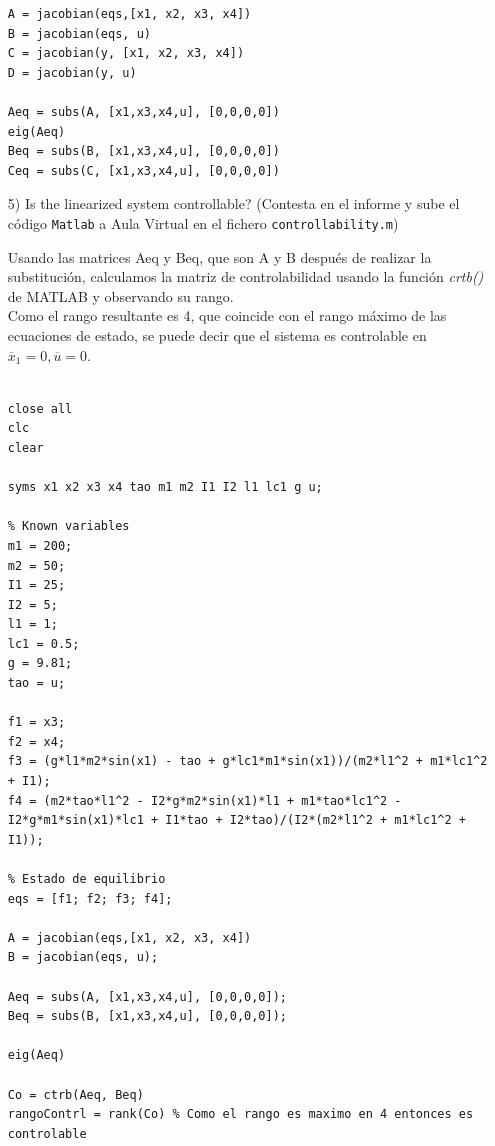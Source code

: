 \documentclass{article}
\begin{document}
\begin{itemize}
\begin{tcolorbox}[width=12cm, title={File \texttt{linearization.m}}]
\begin{scriptsize}
\begin{verbatim}
A = jacobian(eqs,[x1, x2, x3, x4])
B = jacobian(eqs, u)
C = jacobian(y, [x1, x2, x3, x4])
D = jacobian(y, u)

Aeq = subs(A, [x1,x3,x4,u], [0,0,0,0])
eig(Aeq)
Beq = subs(B, [x1,x3,x4,u], [0,0,0,0])
Ceq = subs(C, [x1,x3,x4,u], [0,0,0,0])

\end{verbatim}
\end{scriptsize}
\end{tcolorbox}

\item[5)] 
 {\color{gray} Is the linearized system controllable? 
(Contesta en el informe y sube el c\'odigo \texttt{Matlab} a Aula Virtual en el fichero \texttt{controllability.m})}

\bigskip

Usando las matrices Aeq y Beq, que son A y B después de realizar la substitución, calculamos la matriz de controlabilidad usando la función \textit{crtb()} de MATLAB y observando su rango.\\
Como el rango resultante es 4, que coincide con el rango máximo de las ecuaciones de estado, se puede decir que el sistema es controlable en $\overline{x}_1 = 0, \overline{u} = 0$.

\bigskip

\begin{tcolorbox}[width=12cm, title={File \texttt{controllability.m}}]
\begin{scriptsize}
\begin{verbatim}

close all
clc
clear

syms x1 x2 x3 x4 tao m1 m2 I1 I2 l1 lc1 g u;

% Known variables
m1 = 200;
m2 = 50;
I1 = 25;
I2 = 5;
l1 = 1;
lc1 = 0.5;
g = 9.81;
tao = u;

f1 = x3;
f2 = x4;
f3 = (g*l1*m2*sin(x1) - tao + g*lc1*m1*sin(x1))/(m2*l1^2 + m1*lc1^2 + I1);
f4 = (m2*tao*l1^2 - I2*g*m2*sin(x1)*l1 + m1*tao*lc1^2 - I2*g*m1*sin(x1)*lc1 + I1*tao + I2*tao)/(I2*(m2*l1^2 + m1*lc1^2 + I1));

% Estado de equilibrio
eqs = [f1; f2; f3; f4];

A = jacobian(eqs,[x1, x2, x3, x4])
B = jacobian(eqs, u);

Aeq = subs(A, [x1,x3,x4,u], [0,0,0,0]);
Beq = subs(B, [x1,x3,x4,u], [0,0,0,0]);

eig(Aeq)

Co = ctrb(Aeq, Beq) 
rangoContrl = rank(Co) % Como el rango es maximo en 4 entonces es controlable


\end{verbatim}
\end{scriptsize}
\end{tcolorbox}
\end{itemize}
\end{document}
